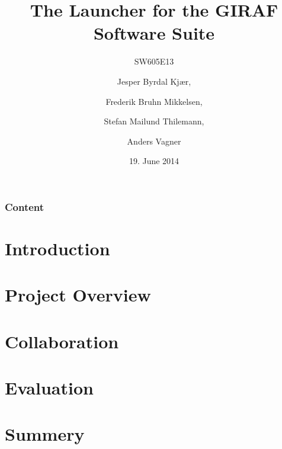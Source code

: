 \documentclass{beamer}
\title[The Launcher for the GIRAF Software Suite]{The Launcher for the GIRAF Software Suite}
\subtitle{SW605E13}
\author[SW605E13]{Jesper Byrdal Kj\ae r, \and Frederik Bruhn Mikkelsen, \and Stefan Mailund Thilemann, \and Anders Vagner}
\institute[Aalborg University]
{
  Department of Computer Science\\
  Aalborg University}
\date[CFP 2003]{19. June 2014}
\begin{document}
\begin{frame}
  \titlepage
\end{frame}

\begin{frame}
    \frametitle{Content}
    \tableofcontents[sectionstyle=show/show,subsectionstyle=hide/hide/hide]
\end{frame}

\section{Introduction}


\section{Project Overview}


\section{Collaboration}


\section{Evaluation}


\section{Summery}

\end{document}
